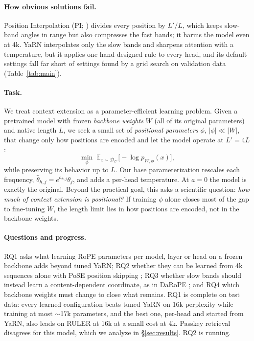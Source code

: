 \documentclass[11pt]{article}
\begin{document}
\paragraph{How obvious solutions fail.}
Position Interpolation (PI; \citealp{chen2023pi}) divides every position by $L'/L$, which keeps slow-band angles in range but also compresses the fast bands; it harms the model even at 4k. YaRN \citep{peng2024yarn} interpolates only the slow bands and sharpens attention with a temperature, but it applies one hand-designed rule to every head, and its default settings fall far short of settings found by a grid search on validation data (Table~\ref{tab:main}).

\paragraph{Task.}
We treat context extension as a parameter-efficient learning problem. Given a pretrained model with frozen \emph{backbone weights} $W$ (all of its original parameters) and native length $L$, we seek a small set of \emph{positional parameters} $\phi$, $|\phi| \ll |W|$, that change only how positions are encoded and let the model operate at $L' = 4L$:
\begin{equation}
\min_{\phi}\; \mathbb{E}_{x\sim\mathcal{D}_{L'}}\big[-\log p_{W,\phi}(x)\big],
\end{equation}
while preserving its behavior up to $L$. Our base parameterization rescales each frequency, $\hat\theta_{h,j} = e^{a_{h,j}}\theta_j$, and adds a per-head temperature. At $a=0$ the model is exactly the original. Beyond the practical goal, this asks a scientific question: \emph{how much of context extension is positional?} If training $\phi$ alone closes most of the gap to fine-tuning $W$, the length limit lies in how positions are encoded, not in the backbone weights.

\paragraph{Questions and progress.}
RQ1 asks what learning RoPE parameters per model, layer or head on a frozen backbone adds beyond tuned YaRN; RQ2 whether they can be learned from 4k sequences alone with PoSE position skipping \citep{zhu2024pose}; RQ3 whether slow bands should instead learn a content-dependent coordinate, as in DaRoPE \citep{levy2026darope}; and RQ4 which backbone weights must change to close what remains. RQ1 is complete on test data: every learned configuration beats tuned YaRN on 16k perplexity while training at most ${\sim}$17k parameters, and the best one, per-head and started from YaRN, also leads on RULER at 16k at a small cost at 4k. Passkey retrieval disagrees for this model, which we analyze in \S\ref{sec:results}. RQ2 is running.
\end{document}
